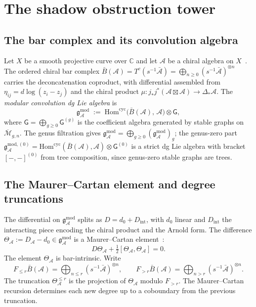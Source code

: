 \documentclass[11pt,reqno]{amsart}
\theoremstyle{definition}
\theoremstyle{remark}
\providecommand{\cA}{\mathcal{A}}
\providecommand{\cM}{\mathcal{M}}
\providecommand{\barB}{\bar{B}}
\providecommand{\Hom}{\mathrm{Hom}}
\providecommand{\gmod}{\mathfrak{g}^{\mathrm{mod}}_{\cA}}
\providecommand{\gmodzero}{\mathfrak{g}^{\mathrm{mod},(0)}_{\cA}}
\numberwithin{equation}{section}
\begin{document}
\section{The shadow obstruction tower}\label{sec:shadow-tower}

\subsection{The bar complex and its convolution algebra}

Let $X$ be a smooth projective curve over $\mathbb{C}$ and let
$\cA$ be a chiral algebra on $X$~\cite{BD04}. The ordered
chiral bar complex
$\barB(\cA)=T^c(s^{-1}\bar{\cA})
=\bigoplus_{n\ge 0}(s^{-1}\bar{\cA})^{\otimes n}$
carries the deconcatenation coproduct, with differential
assembled from $\eta_{ij}=d\log(z_i-z_j)$ and the chiral product
$\mu\colon j_*j^*(\cA\boxtimes\cA)\to\Delta_*\cA$. The
\emph{modular convolution dg Lie algebra} is
\[
\gmod\;:=\;\Hom^{\mathrm{cyc}}
\bigl(\barB(\cA),\,\cA\bigr)\otimes\mathsf{G},
\]
where $\mathsf{G}=\bigoplus_{g\ge 0}\mathsf{G}^{(g)}$ is the
coefficient algebra generated by stable graphs on
$\overline{\cM}_{g,n}$. The genus filtration gives
$\gmod=\bigoplus_{g\ge 0}(\gmod)_g$; the genus-zero part
$\gmodzero=\Hom^{\mathrm{cyc}}(\barB(\cA),\cA)\otimes
\mathsf{G}^{(0)}$ is a strict dg Lie algebra with bracket
$[-,-]^{(0)}$ from tree composition, since genus-zero stable
graphs are trees.

\subsection{The Maurer--Cartan element and degree truncations}

The differential on $\gmod$ splits as $D=d_0+D_{\mathrm{int}}$,
with $d_0$ linear and $D_{\mathrm{int}}$ the interacting piece
encoding the chiral product and the Arnold form. The difference
$\Theta_{\cA}:=D_{\cA}-d_0\in\gmod$ is a Maurer--Cartan
element~\cite[MC2 bar-intrinsic construction]{Lorgat26}:
\begin{equation}\label{eq:mc-equation}
D\Theta_{\cA}+\tfrac12[\Theta_{\cA},\Theta_{\cA}]=0.
\end{equation}
The element $\Theta_{\cA}$ is bar-intrinsic. Write
\[
F_{\le r}\barB(\cA)=\bigoplus_{n\le r}
(s^{-1}\bar{\cA})^{\otimes n},\qquad
F_{>r}\barB(\cA)=\bigoplus_{n>r}
(s^{-1}\bar{\cA})^{\otimes n}.
\]
The truncation $\Theta^{\le r}_{\cA}$ is the projection of
$\Theta_{\cA}$ modulo $F_{>r}$. The Maurer--Cartan recursion
determines each new degree up to a coboundary from the previous
truncation.
\end{document}
